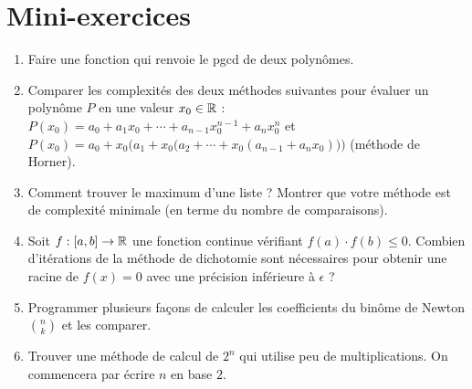 \section{Mini-exercices}

\begin{frame}
\small
\begin{miniexercice}
\begin{enumerate}\setlength{\itemsep}{0pt}
  \item Faire une fonction qui renvoie le pgcd de deux polynômes.
  
  \item Comparer les complexités des deux méthodes suivantes pour évaluer un polynôme $P$ en une valeur $x_0 \in \mathbb{R}$ :
  $P(x_0)= a_0+a_1x_0+\cdots+a_{n-1}x_0^{n-1}+a_nx_0^n$ et $P(x_0)=a_0+x_0\bigg(a_1 + x_0\big(a_2+ \cdots + x_0(a_{n-1}+a_nx_0)\big)\bigg)$
  (méthode de Horner).
  
  \item Comment trouver le maximum d'une liste ? Montrer que votre méthode est de complexité minimale 
 (en terme du nombre de comparaisons).
  
  \item Soit $f : [a,b] \to \mathbb{R}$ une fonction continue vérifiant $f(a)\cdot f(b)\le 0$. Combien d'itérations de la méthode de dichotomie 
  sont nécessaires pour obtenir une racine de $f(x)=0$ avec une précision inférieure à $\epsilon$ ?

  \item Programmer plusieurs façons de calculer les coefficients du binôme de Newton 
  $\binom{n}{k}$ et les comparer.

  \item Trouver une méthode de calcul de $2^n$ qui utilise peu de multiplications. 
  On commencera par écrire $n$ en base $2$.
\end{enumerate}
\end{miniexercice}

\end{frame}

